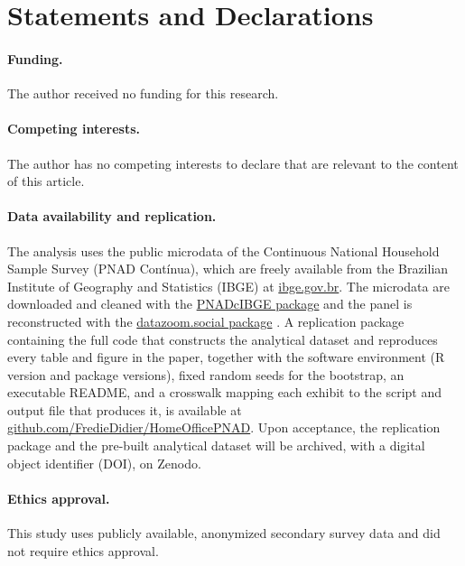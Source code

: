 \documentclass[12pt]{article}
\begin{document}
\newpage

\section*{Statements and Declarations}

\paragraph{Funding.} The author received no funding for this research.

\paragraph{Competing interests.} The author has no competing interests to declare that are relevant to the content of this article.

\paragraph{Data availability and replication.} The analysis uses the public microdata of the Continuous National Household Sample Survey (PNAD Cont\'inua), which are freely available from the Brazilian Institute of Geography and Statistics (IBGE) at \href{https://www.ibge.gov.br/estatisticas/sociais/trabalho/9171-pesquisa-nacional-por-amostra-de-domicilios-continua-mensal.html}{ibge.gov.br}. The microdata are downloaded and cleaned with the \href{https://cran.r-project.org/package=PNADcIBGE}{PNADcIBGE package} and the panel is reconstructed with the \href{https://github.com/datazoompuc/datazoom.social}{datazoom.social package} \citep{DataZoom2024}. A replication package containing the full code that constructs the analytical dataset and reproduces every table and figure in the paper, together with the software environment (R version and package versions), fixed random seeds for the bootstrap, an executable README, and a crosswalk mapping each exhibit to the script and output file that produces it, is available at \href{https://github.com/FredieDidier/HomeOfficePNAD}{github.com/FredieDidier/HomeOfficePNAD}. Upon acceptance, the replication package and the pre-built analytical dataset will be archived, with a digital object identifier (DOI), on Zenodo.

\paragraph{Ethics approval.} This study uses publicly available, anonymized secondary survey data and did not require ethics approval.

\clearpage


\clearpage
\appendix

\end{document}
